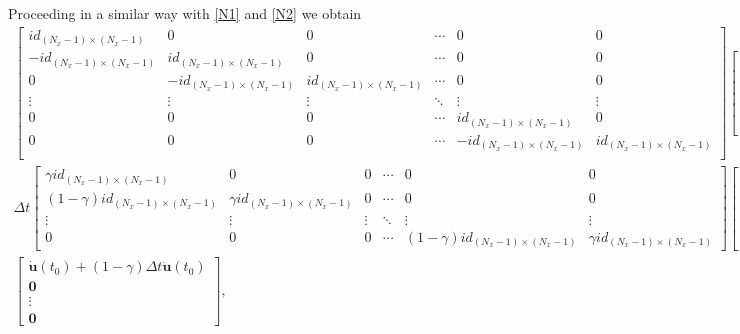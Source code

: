 \documentclass{ws-m3as}
\begin{document}
Proceeding in a similar way with \eqref{N1} and \eqref{N2} we obtain
\begin{align*}
\left[
\begin{array}{ccccccc}
id_{(N_x-1)\times(N_x-1)}& 0 & 0  &\cdots & 0 & 0 \\
 -id_{(N_x-1)\times(N_x-1)} & id_{(N_x-1)\times(N_x-1)} & 0 & \cdots & 0 & 0 \\
0 & -id_{(N_x-1)\times(N_x-1)} & id_{(N_x-1)\times(N_x-1)} & \cdots & 0 & 0 \\
\vdots & \vdots & \vdots & \ddots & \vdots & \vdots \\
0 & 0 & 0 & \cdots & id_{(N_x-1)\times(N_x-1)}  & 0 \\
0 & 0 & 0 & \cdots & -id_{(N_x-1)\times(N_x-1)} &  id_{(N_x-1)\times(N_x-1)} \\
\end{array}
\right]\left[
\begin{array}{c}
\dot{\mathbf{u}}(t_1)\\
\dot{\mathbf{u}}(t_2) \\
\vdots \\
\dot{\mathbf{u}}(t_{N_t}) 
\end{array}
\right] -
\end{align*}
\begin{align*}
\Delta t\left[
\begin{array}{cccccc}
 \gamma id_{(N_x-1)\times(N_x-1)} & 0 & 0  &\cdots & 0 & 0 \\
 \left(1-\gamma\right)id_{(N_x-1)\times(N_x-1)} & \gamma id_{(N_x-1)\times(N_x-1)} & 0 &  \cdots & 0 & 0  \\
\vdots & \vdots & \vdots & \ddots & \vdots & \vdots  \\
0 & 0 & 0 &\cdots & \left(1-\gamma\right)id_{(N_x-1)\times(N_x-1)} & \gamma id_{(N_x-1)\times(N_x-1)}
\end{array}
\right]\left[
\begin{array}{c}
\ddot{\mathbf{u}}(t_1)\\
\ddot{\mathbf{u}}(t_2) \\
\vdots \\
\ddot{\mathbf{u}}(t_{N_t}) 
\end{array}
\right] = \\
\left[
\begin{array}{c}
\dot{\mathbf{u}}(t_0) + \left(1-\gamma\right)\Delta t\ddot{\mathbf{u}}(t_0) \\
\mathbf{0} \\
\vdots \\
\mathbf{0} 
\end{array}
\right],
\end{align*}
\end{document}
